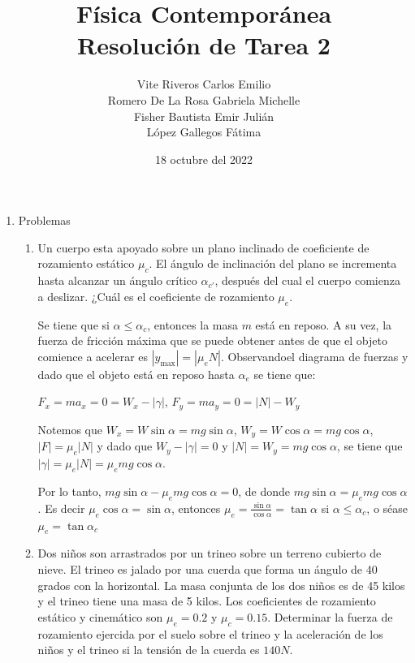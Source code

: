 \documentclass[10pt, a4paper]{article}
\title{Física Contemporánea\\Resolución de Tarea 2}
\author{Vite Riveros Carlos Emilio\\ Romero De La Rosa Gabriela Michelle\\ 
        Fisher Bautista Emir Julián\\ López Gallegos Fátima}
\date{18 octubre del 2022}
\begin{document}
    \maketitle

    \begin{enumerate}
        \item Problemas
        \begin{enumerate}
            \item Un cuerpo esta apoyado sobre un plano inclinado de coeficiente de rozamiento
            estático $\mu_c$. El ángulo de inclinación del plano se incrementa hasta alcanzar un
            ángulo crítico $\alpha_{c'}$, después del cual el cuerpo comienza a deslizar. ¿Cuál es el
            coeficiente de rozamiento $\mu_e$.

            \begin{center}
                Se tiene que si $\alpha\leq\alpha_c$, entonces la masa $m$ está en reposo. A su vez, la 
                fuerza de fricción máxima que se puede obtener antes de que el objeto comience a acelerar
                es $|y_{\text{max}}|=|\mu_e N|$. Observandoel diagrama de fuerzas y dado que el objeto
                está en reposo hasta $\alpha_e$ se tiene que:

                $F_x= ma_x= 0= W_x - |\gamma|$, $F_y=ma_y=0=|N|-W_y$

                Notemos que $W_x=W\sin\alpha=mg\sin\alpha$, $W_y=W\cos\alpha=mg\cos\alpha$, $|F|=\mu_e|N|$
                y dado que $W_y-|\gamma|=0$ y $|N|=W_y=mg\cos\alpha$, se tiene que $|\gamma|=\mu_e|N|=\mu_e mg\cos\alpha$.

                Por lo tanto, $mg\sin\alpha-\mu_e mg\cos\alpha=0$, de donde $mg\sin\alpha=\mu_e mg\cos\alpha$.
                Es decir $\mu_e\cos\alpha=\sin\alpha$, entonces $\mu_e=\frac{\sin\alpha}{\cos\alpha}=\tan\alpha$
                si $\alpha\leq\alpha_c$, o séase $\mu_e=\tan\alpha_c$

            \end{center}

            \item Dos niños son arrastrados por un trineo sobre un terreno cubierto de nieve.
            El trineo es jalado por una cuerda que forma un ángulo de 40 grados con la
            horizontal. La masa conjunta de los dos niños es de 45 kilos y el trineo tiene
            una masa de 5 kilos. Los coeficientes de rozamiento estático y cinemático son
            $\mu_e = 0.2$ y $\mu_c = 0.15$. Determinar la fuerza de rozamiento ejercida por el suelo
            sobre el trineo y la aceleración de los niños y el trineo si la tensión de la cuerda
            es $140\si{N}$.


\end{enumerate}
\end{enumerate}
\end{document}
